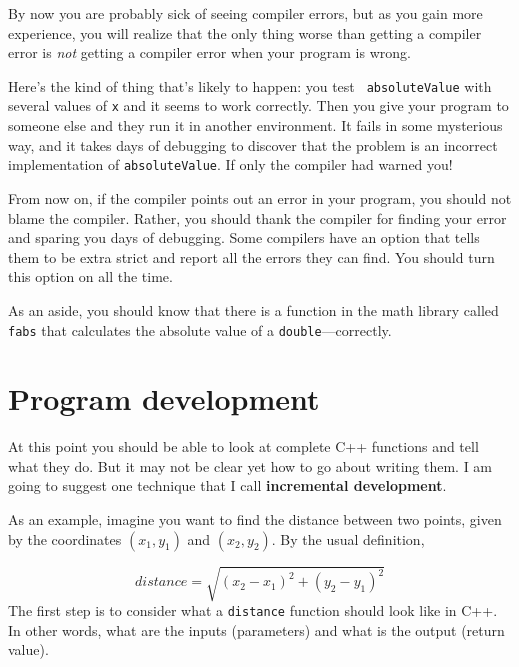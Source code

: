
By now you are probably sick of seeing compiler errors, but as you
gain more experience, you will realize that the only thing worse
than getting a compiler error is {\em not} getting a compiler error
when your program is wrong.

Here's the kind of thing that's likely to happen: you test {\tt
absoluteValue} with several values of {\tt x} and it seems to work
correctly.  Then you give your program to someone else and they run it
in another environment.  It fails in some mysterious way, and it
takes days of debugging to discover that the problem is an
incorrect implementation of {\tt absoluteValue}.  If only the
compiler had warned you!


From now on, if the compiler points out an error in your program, you
should not blame the compiler.  Rather, you should thank the compiler
for finding your error and sparing you days of debugging.  Some
compilers have an option that tells them to be extra strict and report
all the errors they can find.  You should turn this option on all the
time.


As an aside, you should know that there is a function in the
math library called {\tt fabs} that calculates the absolute
value of a {\tt double}---correctly.

\section{Program development}
\label{distance}

At this point you should be able to look at complete C++ functions
and tell what they do.  But it may not be clear yet how to go
about writing them.  I am going to suggest one technique that
I call {\bf incremental development}.


As an example, imagine you want to find the distance between two
points, given by the coordinates $(x_1, y_1)$ and $(x_2, y_2)$.  By
the usual definition,

\begin{equation}
distance = \sqrt{(x_2 - x_1)^2 + (y_2 - y_1)^2}
\end{equation}
%
The first step is to consider what a {\tt distance} function
should look like in C++.  In other words, what are the inputs
(parameters) and what is the output (return value).

